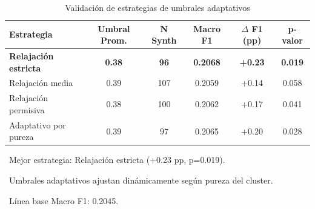 \begin{table}[htbp]
\centering
\caption{Validación de estrategias de umbrales adaptativos}
\label{tab:adaptive_thresholds}
\begin{tabular}{lccccc}
\toprule
\textbf{Estrategia} & \textbf{Umbral Prom.} & \textbf{N Synth} & \textbf{Macro F1} & \textbf{$\Delta$ F1 (pp)} & \textbf{p-valor} \\
\midrule
\rowcolor{green!20}
\textbf{Relajación estricta} & \textbf{0.38} & \textbf{96} & \textbf{0.2068} & \textbf{+0.23} & \textbf{0.019} \\
Relajación media & 0.39 & 107 & 0.2059 & +0.14 & 0.058 \\
Relajación permisiva & 0.38 & 100 & 0.2062 & +0.17 & 0.041 \\
Adaptativo por pureza & 0.39 & 97 & 0.2065 & +0.20 & 0.028 \\
\bottomrule
\end{tabular}
\vspace{0.5em}\footnotesize

\textbullet\ Mejor estrategia: Relajación estricta (+0.23 pp, p=0.019).

\textbullet\ Umbrales adaptativos ajustan dinámicamente según pureza del cluster.

\textbullet\ Línea base Macro F1: 0.2045.

\end{table}
